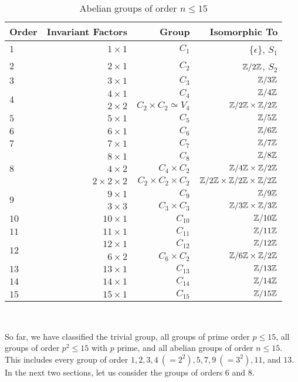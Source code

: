 \begin{center}
  \begin{table}[H]
    \begin{tabular}{ l | r | r | r }
      Order & Invariant Factors & Group & Isomorphic To \\
      \midrule
      $1$ & $1 \times 1$ & $C_1$ & $\{ \epsilon \}$, $S_1$ \\
      \midrule
      $2$ & $2 \times 1$ & $C_2$ & $\mathbb{Z}/2\mathbb{Z}$, $S_2$ \\
      \midrule
      $3$ & $3 \times 1$ & $C_3$ & $\mathbb{Z}/3\mathbb{Z}$ \\
      \midrule
      \multirow{2}{*}{$4$} & $4 \times 1$ & $C_4$ & $\mathbb{Z}/4\mathbb{Z}$ \\
          & $2 \times 2$ & $C_2 \times C_2 \simeq V_4$ & $\mathbb{Z}/2\mathbb{Z} \times \mathbb{Z}/2\mathbb{Z}$ \\
      \midrule
      $5$ & $5 \times 1$ & $C_5$ & $\mathbb{Z}/5\mathbb{Z}$ \\
      \midrule
      $6$ & $6 \times 1$ & $C_6$ & $\mathbb{Z}/6\mathbb{Z}$ \\
      \midrule
      $7$ & $7 \times 1$ & $C_7$ & $\mathbb{Z}/7\mathbb{Z}$ \\
      \midrule
      \multirow{3}{*}{$8$} & $8 \times 1$ & $C_8$ & $\mathbb{Z}/8\mathbb{Z}$ \\
          & $4 \times 2$ & $C_4 \times C_2$ & $\mathbb{Z}/4\mathbb{Z} \times \mathbb{Z}/2\mathbb{Z}$\\
          & $2 \times 2 \times 2$ & $C_2 \times C_2 \times C_2$ & $\mathbb{Z}/2\mathbb{Z} \times \mathbb{Z}/2\mathbb{Z} \times \mathbb{Z}/2\mathbb{Z}$ \\
      \midrule
      \multirow{2}{*}{$9$} & $9 \times 1$ & $C_9$ & $\mathbb{Z}/9\mathbb{Z}$ \\
          & $3 \times 3$ & $C_3 \times C_3$ & $\mathbb{Z}/3\mathbb{Z} \times \mathbb{Z}/3\mathbb{Z}$ \\
      \midrule
      $10$ & $10 \times 1$ & $C_{10}$ & $\mathbb{Z}/10\mathbb{Z}$ \\
      \midrule
      $11$ & $11 \times 1$ & $C_{11}$ & $\mathbb{Z}/11\mathbb{Z}$ \\
      \midrule
      \multirow{2}{*}{$12$} & $12 \times 1$ & $C_{12}$ & $\mathbb{Z}/12\mathbb{Z}$ \\
          & $6 \times 2$ & $C_6 \times C_2$ & $\mathbb{Z}/6\mathbb{Z} \times \mathbb{Z}/2\mathbb{Z}$\\
      \midrule
      $13$ & $13 \times 1$ & $C_{13}$ & $\mathbb{Z}/13\mathbb{Z}$ \\
      \midrule
      $14$ & $14 \times 1$ & $C_{14}$ & $\mathbb{Z}/14\mathbb{Z}$ \\
      \midrule
      $15$ & $15 \times 1$ & $C_{15}$ & $\mathbb{Z}/15\mathbb{Z}$ \\
      \bottomrule
    \end{tabular}
    \caption{Abelian groups of order $n \le 15$}~\label{tab:abelian-groups}
  \end{table}
\end{center}

So far, we have classified the trivial group,
all groups of prime order $p \le 15$,
all groups of order $p^2 \le 15$ with $p$ prime,
and all abelian groups of order $n \le 15$.
This includes every group of order
$1, 2, 3, 4\ (= 2^2), 5, 7, 9\ (= 3^2), 11$, and $13$.
In the next two sections, let us consider the groups of orders $6$ and $8$.

